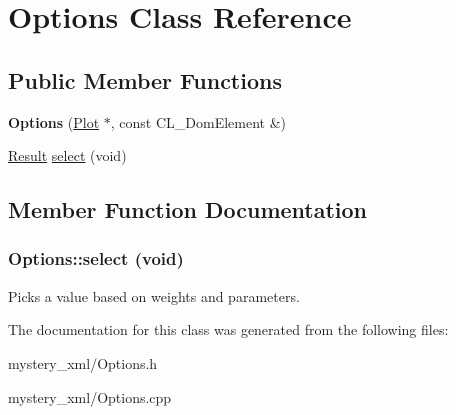 \hypertarget{classOptions}{
\section{Options Class Reference}
\label{classOptions}
}
\subsection*{Public Member Functions}
\begin{DoxyCompactItemize}
\item 
\hypertarget{classOptions_a7724e0a467faf1a7538c7345400c0e3f}{
{\bfseries Options} (\hyperlink{classPlot}{Plot} $\ast$, const CL\_\-DomElement \&)}
\label{classOptions_a7724e0a467faf1a7538c7345400c0e3f}

\item 
\hyperlink{classResult}{Result} \hyperlink{classOptions_af944d166a9889b2ff225fe163ab92671}{select} (void)
\end{DoxyCompactItemize}


\subsection{Member Function Documentation}
\hypertarget{classOptions_af944d166a9889b2ff225fe163ab92671}{
\subsubsection[{select}]{ Options::select (void)}}
\label{classOptions_af944d166a9889b2ff225fe163ab92671}
Picks a value based on weights and parameters. 

The documentation for this class was generated from the following files:\begin{DoxyCompactItemize}
\item 
mystery\_\-xml/Options.h\item 
mystery\_\-xml/Options.cpp\end{DoxyCompactItemize}
